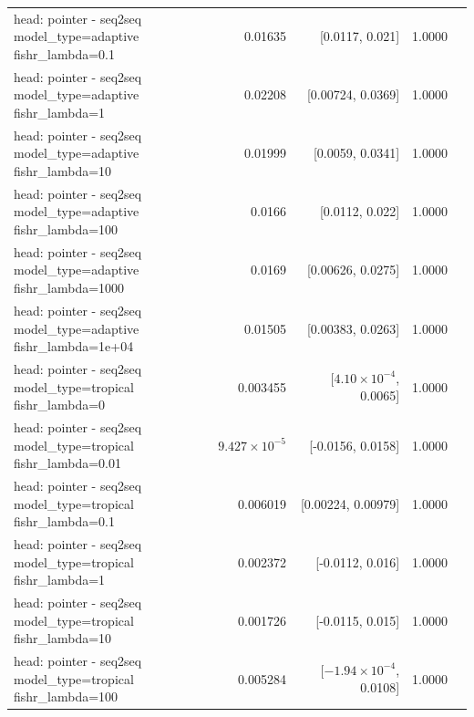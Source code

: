 \documentclass[10pt]{article}
\makeatletter
\newcommand{\stackcell}[1]{\begin{tabular}[t]{@{}l@{}}#1\end{tabular}}
\makeatother
\begin{document}
{\begin{longtable}{lrrrl}
\stackcell{head: pointer - seq2seq\\\footnotesize model\_type=adaptive fishr\_lambda=0.1 } & 0.01635 & [0.0117, 0.021] & 1.0000 & \\
\stackcell{head: pointer - seq2seq\\\footnotesize model\_type=adaptive fishr\_lambda=1 } & 0.02208 & [0.00724, 0.0369] & 1.0000 & \\
\stackcell{head: pointer - seq2seq\\\footnotesize model\_type=adaptive fishr\_lambda=10 } & 0.01999 & [0.0059, 0.0341] & 1.0000 & \\
\stackcell{head: pointer - seq2seq\\\footnotesize model\_type=adaptive fishr\_lambda=100 } & 0.0166 & [0.0112, 0.022] & 1.0000 & \\
\stackcell{head: pointer - seq2seq\\\footnotesize model\_type=adaptive fishr\_lambda=1000 } & 0.0169 & [0.00626, 0.0275] & 1.0000 & \\
\stackcell{head: pointer - seq2seq\\\footnotesize model\_type=adaptive fishr\_lambda=1e+04 } & 0.01505 & [0.00383, 0.0263] & 1.0000 & \\
\stackcell{head: pointer - seq2seq\\\footnotesize model\_type=tropical fishr\_lambda=0 } & 0.003455 & [$4.10\times10^{-4}$, 0.0065] & 1.0000 & \\
\stackcell{head: pointer - seq2seq\\\footnotesize model\_type=tropical fishr\_lambda=0.01 } & $9.427\times10^{-5}$ & [-0.0156, 0.0158] & 1.0000 & \\
\stackcell{head: pointer - seq2seq\\\footnotesize model\_type=tropical fishr\_lambda=0.1 } & 0.006019 & [0.00224, 0.00979] & 1.0000 & \\
\stackcell{head: pointer - seq2seq\\\footnotesize model\_type=tropical fishr\_lambda=1 } & 0.002372 & [-0.0112, 0.016] & 1.0000 & \\
\stackcell{head: pointer - seq2seq\\\footnotesize model\_type=tropical fishr\_lambda=10 } & 0.001726 & [-0.0115, 0.015] & 1.0000 & \\
\stackcell{head: pointer - seq2seq\\\footnotesize model\_type=tropical fishr\_lambda=100 } & 0.005284 & [$-1.94\times10^{-4}$, 0.0108] & 1.0000 & \\

\end{longtable}}
\end{document}
